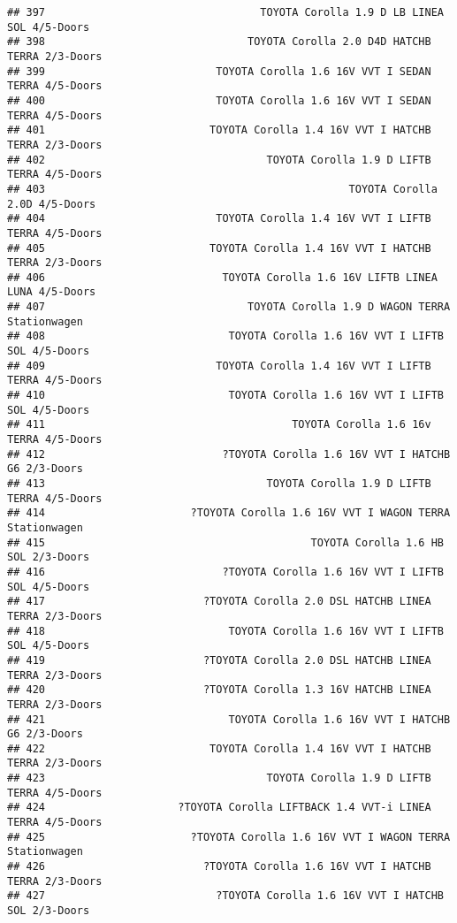 \documentclass[]{article}
\begin{document}
\begin{verbatim}
## 397                                  TOYOTA Corolla 1.9 D LB LINEA SOL 4/5-Doors
## 398                                TOYOTA Corolla 2.0 D4D HATCHB TERRA 2/3-Doors
## 399                           TOYOTA Corolla 1.6 16V VVT I SEDAN TERRA 4/5-Doors
## 400                           TOYOTA Corolla 1.6 16V VVT I SEDAN TERRA 4/5-Doors
## 401                          TOYOTA Corolla 1.4 16V VVT I HATCHB TERRA 2/3-Doors
## 402                                   TOYOTA Corolla 1.9 D LIFTB TERRA 4/5-Doors
## 403                                                TOYOTA Corolla 2.0D 4/5-Doors
## 404                           TOYOTA Corolla 1.4 16V VVT I LIFTB TERRA 4/5-Doors
## 405                          TOYOTA Corolla 1.4 16V VVT I HATCHB TERRA 2/3-Doors
## 406                            TOYOTA Corolla 1.6 16V LIFTB LINEA LUNA 4/5-Doors
## 407                                TOYOTA Corolla 1.9 D WAGON TERRA Stationwagen
## 408                             TOYOTA Corolla 1.6 16V VVT I LIFTB SOL 4/5-Doors
## 409                           TOYOTA Corolla 1.4 16V VVT I LIFTB TERRA 4/5-Doors
## 410                             TOYOTA Corolla 1.6 16V VVT I LIFTB SOL 4/5-Doors
## 411                                       TOYOTA Corolla 1.6 16v TERRA 4/5-Doors
## 412                            ?TOYOTA Corolla 1.6 16V VVT I HATCHB G6 2/3-Doors
## 413                                   TOYOTA Corolla 1.9 D LIFTB TERRA 4/5-Doors
## 414                       ?TOYOTA Corolla 1.6 16V VVT I WAGON TERRA Stationwagen
## 415                                          TOYOTA Corolla 1.6 HB SOL 2/3-Doors
## 416                            ?TOYOTA Corolla 1.6 16V VVT I LIFTB SOL 4/5-Doors
## 417                         ?TOYOTA Corolla 2.0 DSL HATCHB LINEA TERRA 2/3-Doors
## 418                             TOYOTA Corolla 1.6 16V VVT I LIFTB SOL 4/5-Doors
## 419                         ?TOYOTA Corolla 2.0 DSL HATCHB LINEA TERRA 2/3-Doors
## 420                         ?TOYOTA Corolla 1.3 16V HATCHB LINEA TERRA 2/3-Doors
## 421                             TOYOTA Corolla 1.6 16V VVT I HATCHB G6 2/3-Doors
## 422                          TOYOTA Corolla 1.4 16V VVT I HATCHB TERRA 2/3-Doors
## 423                                   TOYOTA Corolla 1.9 D LIFTB TERRA 4/5-Doors
## 424                     ?TOYOTA Corolla LIFTBACK 1.4 VVT-i LINEA TERRA 4/5-Doors
## 425                       ?TOYOTA Corolla 1.6 16V VVT I WAGON TERRA Stationwagen
## 426                         ?TOYOTA Corolla 1.6 16V VVT I HATCHB TERRA 2/3-Doors
## 427                           ?TOYOTA Corolla 1.6 16V VVT I HATCHB SOL 2/3-Doors

\end{verbatim}
\end{document}
